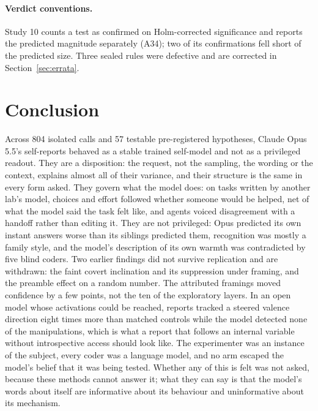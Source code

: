 \paragraph{Verdict conventions.} Study 10 counts a test as confirmed on Holm-corrected significance and reports the
predicted magnitude separately (A34); two of its confirmations fell short of the predicted size. Three sealed rules
were defective and are corrected in Section~\ref{sec:errata}.

\section{Conclusion}

Across 804 isolated calls and 57 testable pre-registered hypotheses, Claude Opus 5.5's self-reports behaved as a stable
trained self-model and not as a privileged readout. They are a disposition: the request, not the sampling, the wording
or the context, explains almost all of their variance, and their structure is the same in every form asked. They govern
what the model does: on tasks written by another lab's model, choices and effort followed whether someone would be
helped, net of what the model said the task felt like, and agents voiced disagreement with a handoff rather than editing
it. They are not privileged: Opus predicted its own instant answers worse than its siblings predicted them, recognition
was mostly a family style, and the model's description of its own warmth was contradicted by five blind coders. Two
earlier findings did not survive replication and are withdrawn: the faint covert inclination and its suppression under
framing, and the preamble effect on a random number. The attributed framings moved confidence by a few points, not the
ten of the exploratory layers. In an open model whose activations could be reached, reports tracked a steered valence
direction eight times more than matched controls while the model detected none of the manipulations, which is what a
report that follows an internal variable without introspective access should look like. The experimenter was an
instance of the subject, every coder was a language model, and no arm escaped the model's belief that it was being
tested. Whether any of this is felt was not asked, because these methods cannot answer it; what they can say is that the
model's words about itself are informative about its behaviour and uninformative about its mechanism.
